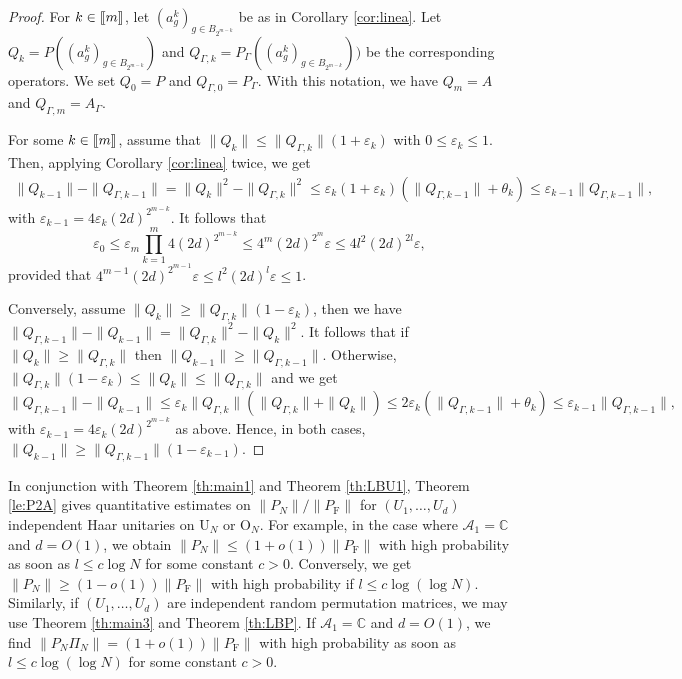 \documentclass[11pt]{article}
\renewcommand{\star}{{\mathrm{F}}}
\newcommand{\cA}{\mathcal{A}}
\newcommand{\dU}{\mathrm {U}}
\newcommand{\dO}{\mathrm{O}}
\newcommand{\dC}{\mathbb {C}}
\newcommand{\1}{1\!\!{\sf I}}
\newcommand{\veps}{\varepsilon}
\newcommand{\INT}[1]{{{\left[\hspace{-1.4pt}\left[#1\right]\hspace{-1.4pt}\right]}}}
\begin{document}
\begin{proof}
For $k \in \INT{m}$, let $(a^k_g)_{g \in B_{2^{m-k}}}$ be as in Corollary \ref{cor:linea}. Let $Q_{k} = P ((a^{k}_g)_{g \in B_{2^{m-k}}}) $ and $Q_{\Gamma,k} = P_\Gamma ( (a^{k}_g)_{g \in B_{2^{m-k}}})) $ be the corresponding operators. We set $Q_0 = P$ and $Q_{\Gamma,0} = P_\Gamma$. With this notation, we have $Q_m = A$ and $Q_{\Gamma,m} = A_\Gamma$.

For some $k \in \INT{m}$, assume that $\| Q_k \| \leq \| Q_{\Gamma,k} \| ( 1+ \veps_k)$ with $0 \leq \veps_k \leq  1$. Then, applying Corollary \ref{cor:linea} twice, we get
\begin{eqnarray*}
\| Q_{k-1} \| - \| Q_{\Gamma,k-1} \|  =  \| Q_{k} \|^2 - \| Q_{\Gamma,k} \|^2 
 \leq   \veps_k (1 + \veps_k) (\|Q_{\Gamma,k-1} \| + \theta_k ) 
 \leq  \veps_{k-1} \| Q_{\Gamma,k-1 } \|,
\end{eqnarray*}
with $\veps_{k-1} = 4 \veps_k (2d)^{2^{m-k}}$. It follows that 
$$
\veps_0 \leq \veps_m \prod_{k=1}^{m} 4 (2d)^{2^{m-k}} \leq  4^m ( 2d)^{2^m} \veps \leq  4 l^2 (2d)^{2l} \veps,
$$
provided that $4^{m-1} (2d)^{2^{m-1}} \veps \leq l^2 (2d)^{l} \veps \leq 1$. 


Conversely, assume $\| Q_k \| \geq \| Q_{\Gamma,k} \| ( 1 - \veps_k)$, then we have
$
\| Q_{\Gamma,k-1} \| - \| Q_{k-1} \|  =  \| Q_{\Gamma,k} \|^2 - \| Q_{k} \|^2. 
$
It follows that if $\| Q_{k} \| \geq \| Q_{\Gamma,k}\|$ then $\| Q_{k-1}\| \geq \| Q_{\Gamma,k-1}\|$. Otherwise, $ \| Q_{\Gamma,k} \| ( 1 - \veps_k) \leq \| Q_k \| \leq \| Q_{\Gamma,k} \|$ and we get
$$
\| Q_{\Gamma,k-1} \| - \|Q_{k-1 }\| \leq \veps_k \| Q_{\Gamma,k}\|( \| Q_{\Gamma,k} \| + \| Q_{k}\|) \leq  2 \veps_k (\| Q_{\Gamma,k-1} \| + \theta_k ) \leq \veps_{k-1}\| Q_{\Gamma,k-1} \|,
$$
with $\veps_{k-1} = 4 \veps_k (2d)^{2^{m-k}}$ as above. Hence, in both cases,  $\| Q_{k-1} \| \geq \| Q_{\Gamma,k-1} \| ( 1 - \veps_{k-1})$.
\end{proof}

In conjunction with Theorem \ref{th:main1} and Theorem \ref{th:LBU1}, Theorem \ref{le:P2A} gives quantitative estimates on $\|P_N\| / \|P_\star \|$ for $(U_1,\ldots,U_d)$ independent Haar unitaries on $\dU_N$ or $\dO_N$. For example, in the case where $\cA_1 = \dC$ and $d = O(1)$, we obtain $\| P_N \| \leq ( 1 + o(1) ) \|P_\star\|$ with high probability as soon as  $l \leq c \log N$ for some constant $c >0$. Conversely, we get $\|P_N\| \geq ( 1 - o(1) ) \|P_\star \|$ with high probability if $l \leq c \log (\log N)$. Similarly, if $(U_1,\ldots,U_d)$ are independent random permutation matrices, we may use Theorem \ref{th:main3} and Theorem \ref{th:LBP}. If $\cA_1 = \dC$  and $ d = O(1)$, we find $\| P_N \Pi_N \| = ( 1 + o(1) ) \|P_\star\|$ with high probability as soon as  $l \leq c \log (\log N)$ for some constant $c >0$.
\end{document}
